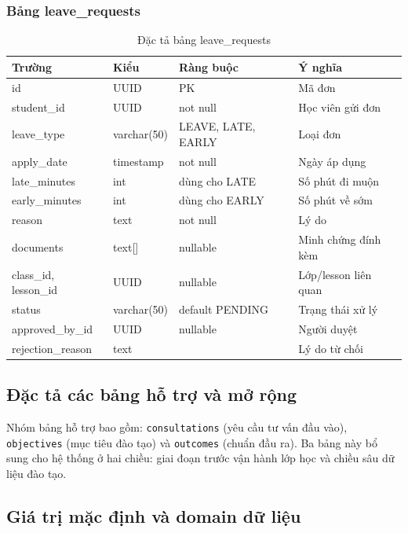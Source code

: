 \documentclass[../DoAn.tex]{subfiles}
\begin{document}
\subsubsection{Bảng leave\_requests}
\begin{table}[H]
\centering
\caption{Đặc tả bảng leave\_requests}
\scriptsize
\begin{tabular}{|l|l|p{3cm}|p{3.5cm}|}
\hline
\textbf{Trường} & \textbf{Kiểu} & \textbf{Ràng buộc} & \textbf{Ý nghĩa} \\ \hline
id & UUID & PK & Mã đơn \\ \hline
student\_id & UUID & not null & Học viên gửi đơn \\ \hline
leave\_type & varchar(50) & LEAVE, LATE, EARLY & Loại đơn \\ \hline
apply\_date & timestamp & not null & Ngày áp dụng \\ \hline
late\_minutes & int & dùng cho LATE & Số phút đi muộn \\ \hline
early\_minutes & int & dùng cho EARLY & Số phút về sớm \\ \hline
reason & text & not null & Lý do \\ \hline
documents & text[] & nullable & Minh chứng đính kèm \\ \hline
class\_id, lesson\_id & UUID & nullable & Lớp/lesson liên quan \\ \hline
status & varchar(50) & default PENDING & Trạng thái xử lý \\ \hline
approved\_by\_id & UUID & nullable & Người duyệt \\ \hline
rejection\_reason & text & & Lý do từ chối \\ \hline
\end{tabular}
\end{table}

\subsection{Đặc tả các bảng hỗ trợ và mở rộng}

Nhóm bảng hỗ trợ bao gồm: \texttt{consultations} (yêu cầu tư vấn đầu vào), \texttt{objectives} (mục tiêu đào tạo) và \texttt{outcomes} (chuẩn đầu ra). Ba bảng này bổ sung cho hệ thống ở hai chiều: giai đoạn trước vận hành lớp học và chiều sâu dữ liệu đào tạo.

\subsection{Giá trị mặc định và domain dữ liệu}
\end{document}
